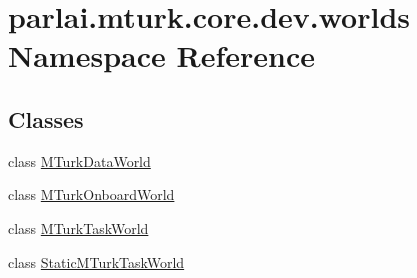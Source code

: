 \hypertarget{namespaceparlai_1_1mturk_1_1core_1_1dev_1_1worlds}{}\section{parlai.\+mturk.\+core.\+dev.\+worlds Namespace Reference}
\label{namespaceparlai_1_1mturk_1_1core_1_1dev_1_1worlds}
\subsection*{Classes}
\begin{DoxyCompactItemize}
\item 
class \hyperlink{classparlai_1_1mturk_1_1core_1_1dev_1_1worlds_1_1MTurkDataWorld}{M\+Turk\+Data\+World}
\item 
class \hyperlink{classparlai_1_1mturk_1_1core_1_1dev_1_1worlds_1_1MTurkOnboardWorld}{M\+Turk\+Onboard\+World}
\item 
class \hyperlink{classparlai_1_1mturk_1_1core_1_1dev_1_1worlds_1_1MTurkTaskWorld}{M\+Turk\+Task\+World}
\item 
class \hyperlink{classparlai_1_1mturk_1_1core_1_1dev_1_1worlds_1_1StaticMTurkTaskWorld}{Static\+M\+Turk\+Task\+World}
\end{DoxyCompactItemize}
